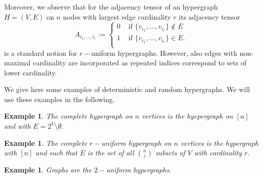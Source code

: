 \documentclass[11pt]{article}
\newtheorem{example}[theorem]{Example}
\begin{document}
%
Moreover, we observe that for the adjacency tensor of an hypergraph $H=(V,E)$ on $n$ nodes with largest edge cardinality $r$ its adjacency tensor
\begin{equation*}
A_{i_1,\ldots,i_r}:=\begin{cases}
0 & \text{ if }\{v_{i_1},\ldots,v_{i_r}\}\notin E\\
1 &  \text{ if }\{v_{i_1},\ldots,v_{i_r}\}\in E.\\
\end{cases}
\end{equation*}
is a standard notion for $r-$uniform hypergraphs. However, also edges with non-maximal cardinality are incorporated as repeated indices correspond to sets of lower cardinality. 

We give here some examples of deterministic and random hypergraphs. We will use these examples in the following.

\begin{example}
The \emph{complete} hypergraph on $n$ vertices is the hyepergraph on $[n]$ and with $E=2^V\setminus\emptyset$.  
\end{example}


\begin{example}
 The \emph{complete $r-$uniform} hypergraph on $n$ vertices is the hypergraph with $[n]$ and such that $E$ is the set of all ${n \choose r}$  subsets of $V$ with cardinality $r$. 
\end{example}

\begin{example}
  Graphs are the $2-$uniform hypergraphs.  
\end{example}
\end{document}
